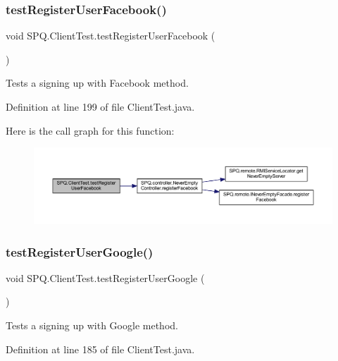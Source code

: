 \subsubsection{\texorpdfstring{test\+Register\+User\+Facebook()}{testRegisterUserFacebook()}}
{\footnotesize\ttfamily void S\+P\+Q.\+Client\+Test.\+test\+Register\+User\+Facebook (\begin{DoxyParamCaption}{ }\end{DoxyParamCaption})}

Tests a signing up with Facebook method. 

Definition at line 199 of file Client\+Test.\+java.

Here is the call graph for this function\+:\nopagebreak
\begin{figure}[H]
\begin{center}
\leavevmode
\includegraphics[width=350pt]{class_s_p_q_1_1_client_test_ae74ec6f1a9672b8dbffeaf89abe44bbd_cgraph}
\end{center}
\end{figure}
\mbox{\label{class_s_p_q_1_1_client_test_a5f10079da4053b4e2c183b715c246bfa}} 
\subsubsection{\texorpdfstring{test\+Register\+User\+Google()}{testRegisterUserGoogle()}}
{\footnotesize\ttfamily void S\+P\+Q.\+Client\+Test.\+test\+Register\+User\+Google (\begin{DoxyParamCaption}{ }\end{DoxyParamCaption})}

Tests a signing up with Google method. 

Definition at line 185 of file Client\+Test.\+java.

